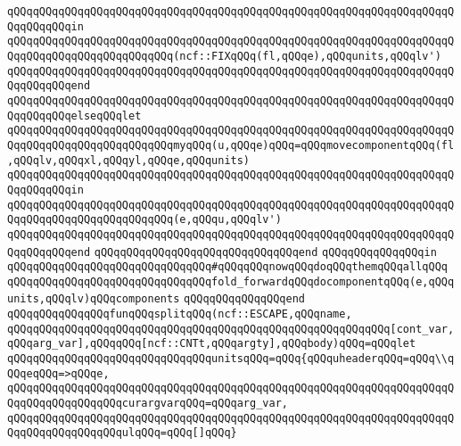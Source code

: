 \verb|qQQqqQQqqQQqqQQqqQQqqQQqqQQqqQQqqQQqqQQqqQQqqQQqqQQqqQQqqQQqqQQqqQQqqQQqqQQqqQQqin|\newline
\verb|qQQqqQQqqQQqqQQqqQQqqQQqqQQqqQQqqQQqqQQqqQQqqQQqqQQqqQQqqQQqqQQqqQQqqQQqqQQqqQQqqQQqqQQqqQQqqQQq(ncf::FIXqQQq(fl,qQQqe),qQQqunits,qQQqlv')|\newline
\verb|qQQqqQQqqQQqqQQqqQQqqQQqqQQqqQQqqQQqqQQqqQQqqQQqqQQqqQQqqQQqqQQqqQQqqQQqqQQqqQQqend|\newline
\verb|qQQqqQQqqQQqqQQqqQQqqQQqqQQqqQQqqQQqqQQqqQQqqQQqqQQqqQQqqQQqqQQqqQQqqQQqqQQqqQQqelseqQQqlet|\newline
\verb|qQQqqQQqqQQqqQQqqQQqqQQqqQQqqQQqqQQqqQQqqQQqqQQqqQQqqQQqqQQqqQQqqQQqqQQqqQQqqQQqqQQqqQQqqQQqqQQqmyqQQq(u,qQQqe)qQQq=qQQqmovecomponentqQQq(fl,qQQqlv,qQQqxl,qQQqyl,qQQqe,qQQqunits)|\newline
\verb|qQQqqQQqqQQqqQQqqQQqqQQqqQQqqQQqqQQqqQQqqQQqqQQqqQQqqQQqqQQqqQQqqQQqqQQqqQQqqQQqin|\newline
\verb|qQQqqQQqqQQqqQQqqQQqqQQqqQQqqQQqqQQqqQQqqQQqqQQqqQQqqQQqqQQqqQQqqQQqqQQqqQQqqQQqqQQqqQQqqQQqqQQq(e,qQQqu,qQQqlv')|\newline
\verb|qQQqqQQqqQQqqQQqqQQqqQQqqQQqqQQqqQQqqQQqqQQqqQQqqQQqqQQqqQQqqQQqqQQqqQQqqQQqqQQqend|\newline
\verb|qQQqqQQqqQQqqQQqqQQqqQQqqQQqqQQqend|\newline
\newline
\verb|qQQqqQQqqQQqqQQqin|\newline
\verb|qQQqqQQqqQQqqQQqqQQqqQQqqQQqqQQq#qQQqqQQqnowqQQqdoqQQqthemqQQqallqQQq|\newline
\verb|qQQqqQQqqQQqqQQqqQQqqQQqqQQqqQQqfold_forwardqQQqdocomponentqQQq(e,qQQqunits,qQQqlv)qQQqcomponents|\newline
\verb|qQQqqQQqqQQqqQQqend|\newline
\newline
\verb|qQQqqQQqqQQqqQQqfunqQQqsplitqQQq(ncf::ESCAPE,qQQqname,|\newline
\verb|qQQqqQQqqQQqqQQqqQQqqQQqqQQqqQQqqQQqqQQqqQQqqQQqqQQqqQQqqQQq[cont_var,qQQqarg_var],qQQqqQQq[ncf::CNTt,qQQqargty],qQQqbody)qQQq=qQQqlet|\newline
\verb|qQQqqQQqqQQqqQQqqQQqqQQqqQQqqQQqunitsqQQq=qQQq{qQQquheaderqQQq=qQQq\\qQQqeqQQq=>qQQqe,|\newline
\verb|qQQqqQQqqQQqqQQqqQQqqQQqqQQqqQQqqQQqqQQqqQQqqQQqqQQqqQQqqQQqqQQqqQQqqQQqqQQqqQQqqQQqqQQqcurargvarqQQq=qQQqarg_var,|\newline
\verb|qQQqqQQqqQQqqQQqqQQqqQQqqQQqqQQqqQQqqQQqqQQqqQQqqQQqqQQqqQQqqQQqqQQqqQQqqQQqqQQqqQQqqQQqulqQQq=qQQq[]qQQq}|\newline
